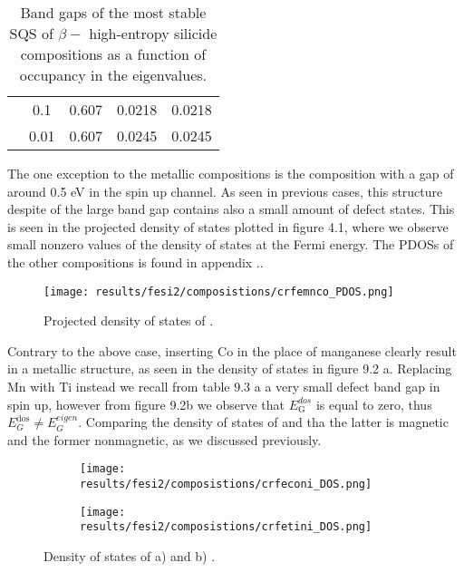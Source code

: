 \begin{table}[H]
\begin{tabular}{@{}ccccc@{}}
\multicolumn{1}{c|}{}                             & \multicolumn{1}{c|}{0.1}  & 0.607                                                                         & 0.0218                                                                        & 0.0218                                                                         \\
\multicolumn{1}{c|}{}                             & \multicolumn{1}{c|}{0.01}                      & 0.607                                                                         & 0.0245                                                                        & 0.0245                                                                         \\ \bottomrule
\end{tabular}
\caption{Band gaps of the most stable SQS of $\beta-$  high-entropy silicide compositions as a function of occupancy in the eigenvalues.}
\end{table}

The one exception to the metallic compositions is the  composition with a gap of around 0.5 eV in the spin up channel. As seen in previous cases, this structure despite of the large band gap contains also a small amount of defect states. This is seen in the projected density of states plotted in figure 4.1, where we observe small nonzero values of the density of states at the Fermi energy. The PDOSs of the other compositions is found in appendix ..  
  
\begin{figure}[H]
\centering
\texttt{[image: results/fesi2/composistions/crfemnco\_PDOS.png]}
\caption{Projected density of states of .}
\end{figure}

Contrary to the above case, inserting Co in the place of manganese clearly result in a metallic structure, as seen in the density of states in figure 9.2 a. Replacing Mn with Ti instead we recall from table 9.3 a a very small defect band gap in spin up, however from figure 9.2b we observe that $E_\text{G}^{dos}$ is equal to zero, thus $E_G ^\text{dos} \neq E_G ^{eigen}$. Comparing the density of states of  and  tha the latter is magnetic and the former nonmagnetic, as we discussed previously.  


\begin{figure}[H]
\begin{subfigure}{.5\textwidth}
\texttt{[image: results/fesi2/composistions/crfeconi\_DOS.png]}
\caption{}
\end{subfigure}
\begin{subfigure}{.5\textwidth}
\texttt{[image: results/fesi2/composistions/crfetini\_DOS.png]}
\caption{}
\end{subfigure}
\caption{Density of states of a)  and b) .}
\end{figure} 

